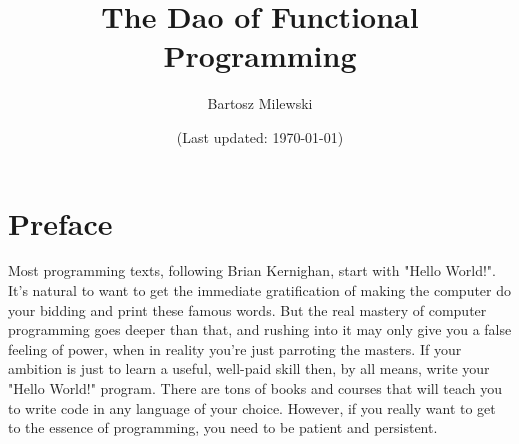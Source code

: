 \documentclass[11pt, book]{memoir}
\begin{document}
\setcounter{tocdepth}{4}
\setcounter{secnumdepth}{4}
\frontmatter

\title{\huge The Dao of Functional Programming}
\author{\Large Bartosz Milewski }

\date{\vfill (Last updated: \today)}

\maketitle

\tableofcontents*

\clearpage

\section{Preface}

Most programming texts, following Brian Kernighan, start with "Hello World!". It's natural to want to get the immediate gratification of making the computer do your bidding and print these famous words. But the real mastery of computer programming goes deeper than that, and rushing into it may only give you a false feeling of power, when in reality you're just parroting the masters. If your ambition is just to learn a useful, well-paid skill then, by all means, write your "Hello World!" program. There are tons of books and courses that will teach you to write code in any language of your choice. However, if you really want to get to the essence of programming, you need to be patient and persistent.


\mainmatter



















\printindex
\end{document}
